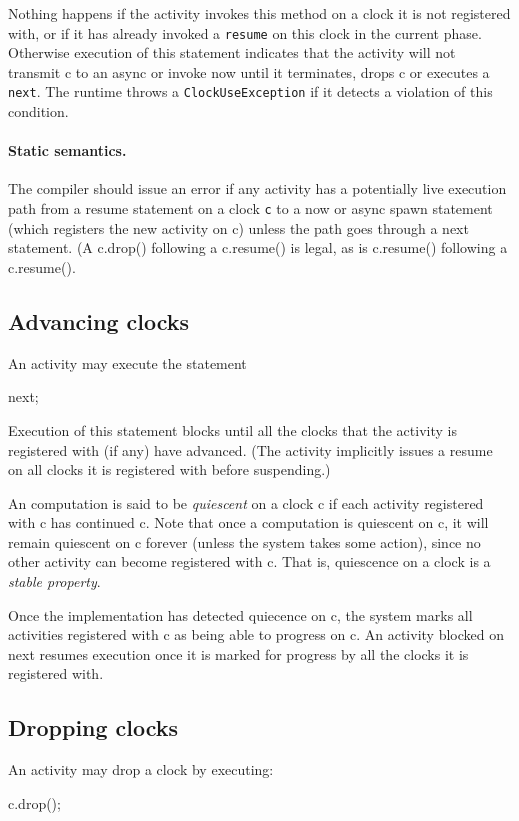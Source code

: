 Nothing happens if the activity invokes this method on a clock it is
not registered with, or if it has already invoked a {\tt resume} on
this clock in the current phase.  Otherwise execution of this
statement indicates that the activity will not transmit {\cf c} to an
async or invoke {\cf now} until it terminates, drops {\cf c} or
executes a {\tt next}. The runtime throws a {\tt ClockUseException} if
it detects a violation of this condition.

\paragraph{Static semantics.} 
The compiler should issue an error if any activity has a potentially
live execution path from a {\cf resume} statement on a clock {\tt c}
to a {\cf now} or async spawn statement (which registers the new
activity on {\cf c}) unless the path goes through a {\cf next}
statement. (A {\cf c.drop()} following a {\cf c.resume()} is legal,
as is {\cf c.resume()} following a {\cf c.resume()}.

\subsection{Advancing clocks}
An activity may execute the statement
\begin{x10}
  next;
\end{x10}

\noindent 
Execution of this statement blocks until all the clocks that the
activity is registered with (if any) have advanced. (The activity
implicitly issues a {\cf resume} on all clocks it is registered
with before suspending.)

An \Xten{} computation is said to be {\em quiescent} on a clock {\cf
c} if each activity registered with {\cf c} has continued {\cf c}.
Note that once a computation is quiescent on {\cf c}, it will remain
quiescent on {\cf c} forever (unless the system takes some action),
since no other activity can become registered with {\cf c}.  That is,
quiescence on a clock is a {\em stable property}.

Once the implementation has detected quiecence on {\cf c}, the system
marks all activities registered with {\cf c} as being able to progress
on {\cf c}. An activity blocked on {\cf next} resumes execution once
it is marked for progress by all the clocks it is registered with.

\subsection{Dropping clocks}
An activity may drop a clock by executing:
\begin{x10}
c.drop();
\end{x10}

